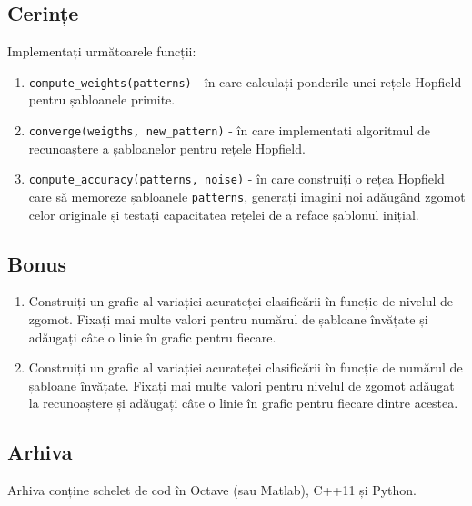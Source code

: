 \documentclass[12pt]{article}
\begin{document}
\subsection*{Cerințe}
\label{sec:tasks10}

Implementați următoarele funcții:
\begin{enumerate}
\item \texttt{compute\_weights(patterns)} - în care calculați
  ponderile unei rețele Hopfield pentru șabloanele primite.
\item \texttt{converge(weigths, new\_pattern)} - în care implementați
  algoritmul de recunoaștere a șabloanelor pentru rețele Hopfield.
\item \texttt{compute\_accuracy(patterns, noise)} - în care construiți
  o rețea Hopfield care să memoreze șabloanele \texttt{patterns},
  generați imagini noi adăugând zgomot celor originale și testați
  capacitatea rețelei de a reface șablonul inițial.
\end{enumerate}

\subsection*{Bonus}
\label{sec:bonus}

\begin{enumerate}
\item Construiți un grafic al variației acurateței clasificării în
  funcție de nivelul de zgomot. Fixați mai multe valori pentru numărul
  de șabloane învățate și adăugați câte o linie în grafic pentru
  fiecare.
\item Construiți un grafic al variației acurateței clasificării în
  funcție de numărul de șabloane învățate. Fixați mai multe valori
  pentru nivelul de zgomot adăugat la recunoaștere și adăugați câte o
  linie în grafic pentru fiecare dintre acestea.
\end{enumerate}

\subsection*{Arhiva}
\label{zip-archive}

Arhiva conține schelet de cod în Octave (sau Matlab), C++11 și Python.
\end{document}
